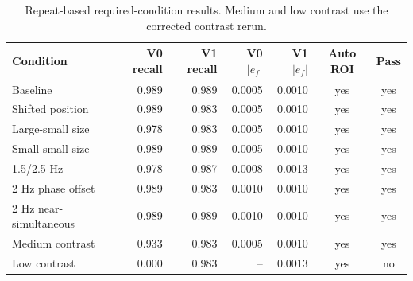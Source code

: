 \begin{table}[htbp]
\centering
\small
\begin{tabular}{p{}rrrrcc}
\toprule
Condition & V0 recall & V1 recall & V0 $|e_f|$ & V1 $|e_f|$ & Auto ROI & Pass \\
\midrule
Baseline & 0.989 & 0.989 & 0.0005 & 0.0010 & yes & yes \\
Shifted position & 0.989 & 0.983 & 0.0005 & 0.0010 & yes & yes \\
Large-small size & 0.978 & 0.983 & 0.0005 & 0.0010 & yes & yes \\
Small-small size & 0.989 & 0.989 & 0.0005 & 0.0010 & yes & yes \\
1.5/2.5 Hz & 0.978 & 0.987 & 0.0008 & 0.0013 & yes & yes \\
2 Hz phase offset & 0.989 & 0.983 & 0.0010 & 0.0010 & yes & yes \\
2 Hz near-simultaneous & 0.989 & 0.989 & 0.0010 & 0.0010 & yes & yes \\
Medium contrast & 0.933 & 0.983 & 0.0005 & 0.0010 & yes & yes \\
Low contrast & 0.000 & 0.983 & -- & 0.0013 & yes & no \\
\bottomrule
\end{tabular}
\caption{Repeat-based required-condition results. Medium and low contrast use the corrected contrast rerun.}
\label{tab:results}
\end{table}